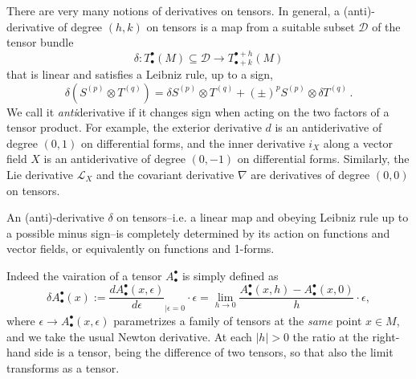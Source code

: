 \documentclass[../geometry_main.tex]{subfiles}
\begin{document}
There are very many notions of derivatives on tensors.
In general, a (anti)-derivative of degree $(h,k)$ on tensors is a map from a suitable subset $\mathcal{D}$ of the tensor bundle 
\begin{equation}
    \delta: T^{\bullet}_{\bullet} (M)\subseteq \mathcal{D} \to T^{\bullet + h}_{\bullet + k} (M)
\end{equation}
that is linear and satisfies a Leibniz rule, up to a sign, 
\begin{equation}
    \delta (S^{(p)} \otimes T^{(q)}) = \delta S^{(p)} \otimes T^{(q)} + (\pm)^{p} S^{(p)} \otimes \delta T^{(q)}\,.
\end{equation}
We call it \emph{anti}derivative if it changes sign when acting on the two factors of a tensor product.
For example, the exterior derivative $d$ is an antiderivative of degree $(0,1)$ on  differential forms, and the inner derivative $i_X$ along a vector field $X$ is an antiderivative of degree $(0,-1)$ on differential forms.
Similarly, the Lie derivative $\mathcal{L}_X$ and the covariant derivative $\nabla$ are derivatives of degree $(0,0)$ on tensors.



\begin{mytheorem}
An (anti)-derivative $\delta$ on tensors--i.e. a linear map and obeying Leibniz rule up to a possible minus sign--is completely determined by its action on functions and vector fields, or equivalently on functions and 1-forms.
\end{mytheorem}



\begin{mytheorem}
Indeed the vairation of a tensor $A^\bullet_\bullet$ is simply defined as 
\begin{equation}
    \delta A^\bullet_\bullet(x):= \frac{d A^\bullet_\bullet(x,\epsilon)}{d\epsilon}_{\mid \epsilon=0} \cdot \epsilon =\lim_{h\to0} \frac{A^\bullet_\bullet(x,h)-A^\bullet_\bullet(x,0)}{h} \cdot \epsilon,
\end{equation}
where $\epsilon\to A^\bullet_\bullet(x,\epsilon)$ parametrizes a family of tensors at the \emph{same} point $x\in M$, and we take the usual Newton derivative.
At each $|h|>0$ the ratio at the right-hand side is a tensor, being the difference of two tensors, so that also the limit transforms as a tensor.
\end{mytheorem}


\end{document}
